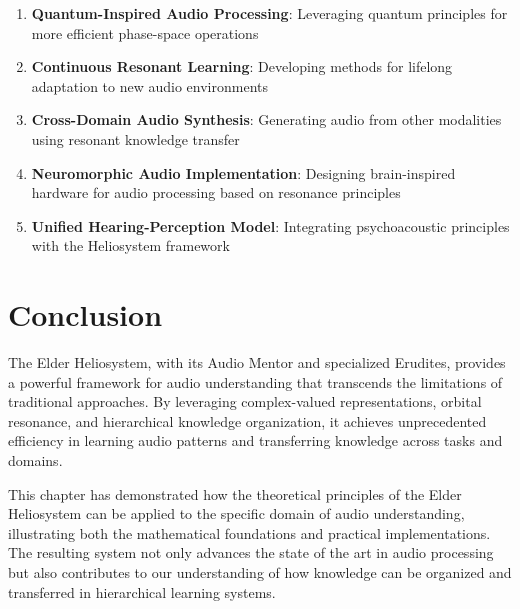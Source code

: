 \begin{enumerate}
    \item \textbf{Quantum-Inspired Audio Processing}: Leveraging quantum principles for more efficient phase-space operations
    \item \textbf{Continuous Resonant Learning}: Developing methods for lifelong adaptation to new audio environments
    \item \textbf{Cross-Domain Audio Synthesis}: Generating audio from other modalities using resonant knowledge transfer
    \item \textbf{Neuromorphic Audio Implementation}: Designing brain-inspired hardware for audio processing based on resonance principles
    \item \textbf{Unified Hearing-Perception Model}: Integrating psychoacoustic principles with the Heliosystem framework
\end{enumerate}

\section{Conclusion}

The Elder Heliosystem, with its Audio Mentor and specialized Erudites, provides a powerful framework for audio understanding that transcends the limitations of traditional approaches. By leveraging complex-valued representations, orbital resonance, and hierarchical knowledge organization, it achieves unprecedented efficiency in learning audio patterns and transferring knowledge across tasks and domains.

This chapter has demonstrated how the theoretical principles of the Elder Heliosystem can be applied to the specific domain of audio understanding, illustrating both the mathematical foundations and practical implementations. The resulting system not only advances the state of the art in audio processing but also contributes to our understanding of how knowledge can be organized and transferred in hierarchical learning systems.